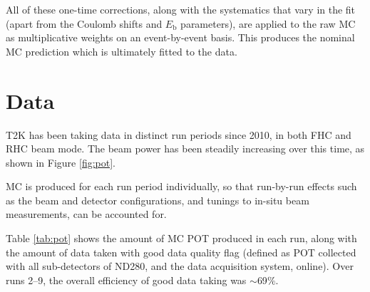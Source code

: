 All of these one-time corrections, along with the systematics that vary in the fit (apart from the Coulomb shifts and $E_{\mathrm{b}}$ parameters), are applied to the raw MC as multiplicative weights on an event-by-event basis. This produces the nominal MC prediction which is ultimately fitted to the data.

\section{Data}\label{sec:data}

T2K has been taking data in distinct run periods since 2010, in both FHC and RHC beam mode. The beam power has been steadily increasing over this time, as shown in Figure \ref{fig:pot}.

MC is produced for each run period individually, so that run-by-run effects such as the beam and detector configurations, and tunings to in-situ beam measurements, can be accounted for.

Table \ref{tab:pot} shows the amount of MC POT produced in each run, along with the amount of data taken with good data quality flag (defined as POT collected with all sub-detectors of ND280, and the data acquisition system, online). Over runs 2--9, the overall efficiency of good data taking was $\sim$69$\%$.

